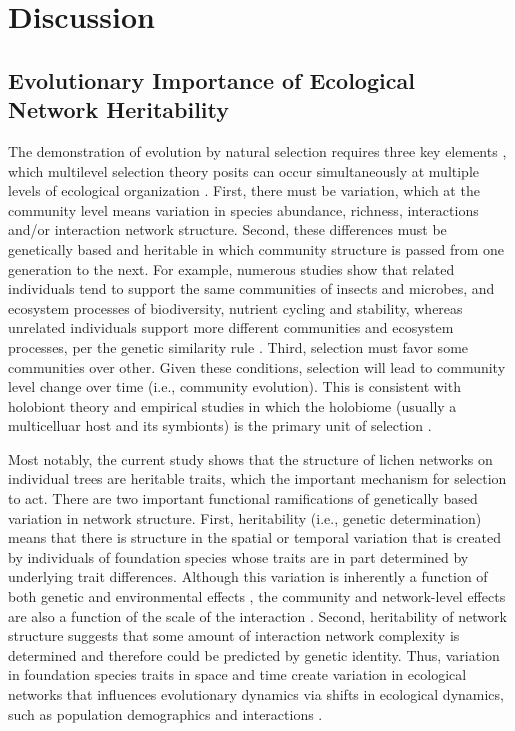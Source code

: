 \documentclass[fleqn,12pt]{olplainarticle}
\begin{document}
\section*{Discussion}


\subsection*{Evolutionary Importance of Ecological Network Heritability}

The demonstration of evolution by natural selection requires three key
elements \citep{Conner2004ATextbook}, which multilevel selection
theory posits can occur simultaneously at multiple levels of
ecological organization \citep{Whitham2003,
  Whitham2020IntraspecificEvolution}. First, there must be variation,
which at the community level means variation in species abundance,
richness, interactions and/or interaction network structure. Second,
these differences must be genetically based and heritable in which
community structure is passed from one generation to the next. For
example, numerous studies show that related individuals tend to
support the same communities of insects and microbes, and ecosystem
processes of biodiversity, nutrient cycling and stability, whereas
unrelated individuals support more different communities and ecosystem
processes, per the genetic similarity rule \citep{Bangert2006,
  Bangert2008a, Barbour2009c,
  Whitham2020IntraspecificEvolution}. Third, selection must favor some
communities over other. Given these conditions, selection will lead to
community level change over time (i.e., community evolution). This is
consistent with holobiont theory and empirical studies
\citep{Zilber-Rosenberg2008, Gilbert2012} in which the holobiome
(usually a multicelluar host and its symbionts) is the primary unit of
selection \citep{Bordenstein2015, Johnson2021}.

Most notably, the current study shows that the structure of lichen
networks on individual trees are heritable traits, which the important
mechanism for selection to act. There are two important functional
ramifications of genetically based variation in network
structure. First, heritability (i.e., genetic determination) means
that there is structure in the spatial or temporal variation that is
created by individuals of foundation species whose traits are in part
determined by underlying trait differences. Although this variation is
inherently a function of both genetic and environmental effects
\citep{Conner2004ATextbook}, the community and network-level effects
are also a function of the scale of the interaction
\citep{Shuster2006COMMUNITYSTRUCTURE-fix, Lau2017a}. Second,
heritability of network structure suggests that some amount of
interaction network complexity is determined and therefore could be
predicted by genetic identity. Thus, variation in foundation species
traits in space and time create variation in ecological networks that
influences evolutionary dynamics via shifts in ecological dynamics,
such as population demographics and interactions
\citep{Guimaraes2020TheOrganization}. 
\end{document}
